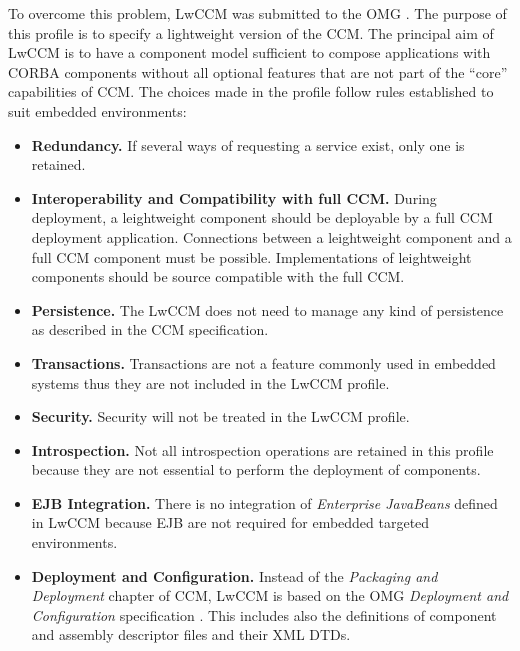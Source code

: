 \vspace{3mm}
\noindent
To overcome this problem, LwCCM
was submitted to the OMG \cite{LwCCM-Specification}.
The purpose of this profile is to specify a lightweight version of the CCM.
The principal aim of LwCCM is to have a component model sufficient to compose
applications with CORBA components without all optional features that are
not part of the ``core'' capabilities of CCM.
The choices made in the profile follow rules established to suit embedded
environments:
\begin{itemize}
\item {\bf Redundancy.}
If several ways of requesting a service exist, only one is retained.

\item {\bf Interoperability and Compatibility with full CCM.}
During deployment, a leightweight component should be deployable by a full
CCM deployment application. Connections between a leightweight component
and a full CCM component must be possible.
Implementations of leightweight components should be source compatible
with the full CCM.

\item {\bf Persistence.}
The LwCCM does not need to manage any kind of persistence as described in the
CCM specification. 

\item {\bf Transactions.}
Transactions are not a feature commonly used in embedded systems thus they
are not included in the LwCCM profile.

\item {\bf Security.}
Security will not be treated in the LwCCM profile.

\item {\bf Introspection.}
Not all introspection operations are retained in this profile because they
are not essential to perform the deployment of components.

\item {\bf EJB Integration.}
There is no integration of {\it Enterprise JavaBeans} defined in LwCCM
because EJB are not required for embedded targeted environments.

\item {\bf Deployment and Configuration.}
Instead of the {\it Packaging and Deployment} chapter of CCM, LwCCM
is based on the OMG {\it Deployment and Configuration} specification 
\cite{DeploymentAndConfiguration}.
This includes also the definitions of component and assembly descriptor
files and their XML DTDs.


\end{itemize}
